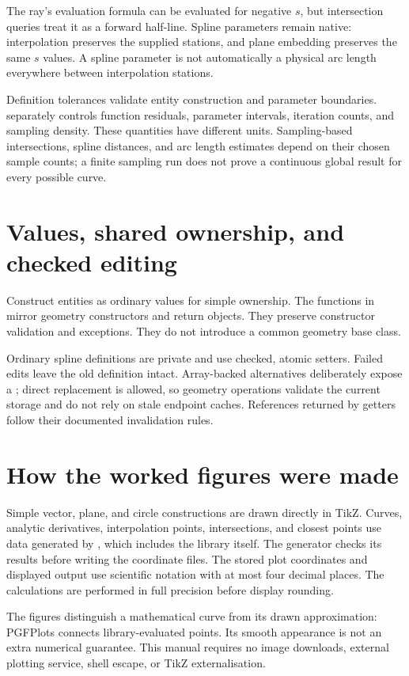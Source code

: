 The ray's evaluation formula can be evaluated for negative $s$, but intersection
queries treat it as a forward half-line. Spline parameters remain native:
interpolation preserves the supplied stations, and plane embedding preserves
the same $s$ values. A spline parameter is not automatically a physical arc
length everywhere between interpolation stations.

\begin{manualnote}
Definition tolerances validate entity construction and parameter boundaries.
 separately controls function residuals,
parameter intervals, iteration counts, and sampling density. These quantities
have different units. Sampling-based intersections, spline distances, and arc
length estimates depend on their chosen sample counts; a finite sampling run
does not prove a continuous global result for every possible curve.
\end{manualnote}

\section{Values, shared ownership, and checked editing}
Construct entities as ordinary values for simple ownership. The
 functions in  mirror geometry constructors and
return  objects. They preserve constructor validation and
exceptions. They do not introduce a common geometry base class.

Ordinary spline definitions are private and use checked, atomic setters.
Failed edits leave the old definition intact. Array-backed alternatives
deliberately expose a ; direct replacement is allowed,
so geometry operations validate the current storage and do not rely on stale
endpoint caches. References returned by getters follow their documented
invalidation rules.

\section{How the worked figures were made}
Simple vector, plane, and circle constructions are drawn directly in TikZ.
Curves, analytic derivatives, interpolation points, intersections, and closest
points use data generated by , which
includes the library itself. The generator checks its results before writing
the coordinate files. The stored plot coordinates and displayed output use
scientific notation with at most four decimal places. The calculations are
performed in full  precision before display rounding.

The figures distinguish a mathematical curve from its drawn approximation:
PGFPlots connects library-evaluated points. Its smooth appearance is not an
extra numerical guarantee. This manual requires no image downloads, external
plotting service, shell escape, or TikZ externalisation.
